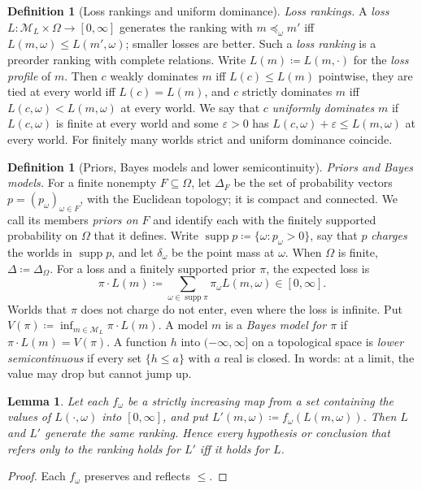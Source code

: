 \documentclass[11pt]{article}
\newtheorem{lemma}[theorem]{Lemma}
\theoremstyle{definition}
\newtheorem{definition}[theorem]{Definition}
\theoremstyle{remark}
\newcommand{\M}{\mathcal M}
\newcommand{\supp}{\operatorname{supp}}
\begin{document}
\begin{definition}[Loss rankings and uniform dominance]\label{def:loss}
\emph{Loss rankings.} A \emph{loss} $L:\M_L\times\Omega\to[0,\infty]$ generates the ranking with $m\preceq_\omega m'$ iff $L(m,\omega)\le L(m',\omega)$; smaller losses are better. Such a \emph{loss ranking} is a preorder ranking with complete relations. Write $L(m)\coloneqq L(m,\cdot)$ for the \emph{loss profile} of $m$. Then $c$ weakly dominates $m$ iff $L(c)\le L(m)$ pointwise, they are tied at every world iff $L(c)=L(m)$, and $c$ strictly dominates $m$ iff $L(c,\omega)<L(m,\omega)$ at every world. We say that $c$ \emph{uniformly dominates} $m$ if $L(c,\omega)$ is finite at every world and some $\varepsilon>0$ has $L(c,\omega)+\varepsilon\le L(m,\omega)$ at every world. For finitely many worlds strict and uniform dominance coincide.
\end{definition}

\begin{definition}[Priors, Bayes models and lower semicontinuity]\label{def:bayes}
\emph{Priors and Bayes models.} For a finite nonempty $F\subseteq\Omega$, let $\Delta_F$ be the set of probability vectors $p=(p_\omega)_{\omega\in F}$, with the Euclidean topology; it is compact and connected. We call its members \emph{priors on $F$} and identify each with the finitely supported probability on $\Omega$ that it defines. Write $\supp p\coloneqq\{\omega:p_\omega>0\}$, say that $p$ \emph{charges} the worlds in $\supp p$, and let $\delta_\omega$ be the point mass at $\omega$. When $\Omega$ is finite, $\Delta\coloneqq\Delta_\Omega$. For a loss and a finitely supported prior $\pi$, the expected loss is
\[
\pi\cdot L(m)\coloneqq\sum_{\omega\in\supp\pi}\pi_\omega L(m,\omega)\in[0,\infty].
\]
Worlds that $\pi$ does not charge do not enter, even where the loss is infinite. Put $V(\pi)\coloneqq\inf_{m\in\M_L}\pi\cdot L(m)$. A model $m$ is a \emph{Bayes model for $\pi$} if $\pi\cdot L(m)=V(\pi)$. A function $h$ into $(-\infty,\infty]$ on a topological space is \emph{lower semicontinuous} if every set $\{h\le a\}$ with $a$ real is closed. In words: at a limit, the value may drop but cannot jump up.
\end{definition}

\begin{lemma}\label{lem:rescale}
Let each $f_\omega$ be a strictly increasing map from a set containing the values of $L(\cdot,\omega)$ into $[0,\infty]$, and put $L'(m,\omega)\coloneqq f_\omega(L(m,\omega))$. Then $L$ and $L'$ generate the same ranking. Hence every hypothesis or conclusion that refers only to the ranking holds for $L'$ iff it holds for $L$.
\end{lemma}
\begin{proof}
Each $f_\omega$ preserves and reflects $\le$.
\end{proof}
\end{document}
